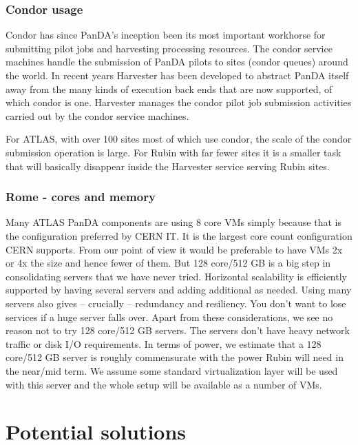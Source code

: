 \subsubsection {Condor usage }
Condor has since PanDA’s inception been its most important workhorse for submitting pilot jobs and harvesting processing resources. The condor service machines handle the submission of PanDA pilots to sites (condor queues) around the world. In recent years Harvester has been developed to abstract PanDA itself away from the many kinds of execution back ends that are now supported, of which condor is one. Harvester manages the condor pilot job submission activities carried out by the condor service machines.

For ATLAS, with over 100 sites most of which use condor, the scale of the condor submission operation is large. For Rubin with far fewer sites it is a smaller task that will basically disappear inside the Harvester service serving Rubin sites.

\subsubsection{Rome  - cores and memory }
Many ATLAS PanDA components are using 8 core VMs simply because that is the configuration preferred by CERN IT. It is the largest core count configuration CERN supports. From our point of view it would be preferable to have VMs 2x or 4x the size and hence fewer of them. But 128 core/512 GB is a big step in consolidating servers that we have never tried. Horizontal scalability is efficiently supported by having several servers and adding additional as needed. Using many servers also gives -- crucially -- redundancy and resiliency. You don’t want to lose services if a huge server falls over.  Apart from these considerations, we see no reason not to try 128 core/512 GB servers. The servers don't have heavy network traffic or disk I/O requirements. In terms of power, we estimate that a 128 core/512 GB server is roughly commensurate with the power Rubin will need in the near/mid term. We assume some standard virtualization layer will be used with this server and the whole setup will be available as a number of VMs.



\section {Potential solutions} \label{sec:potential}

